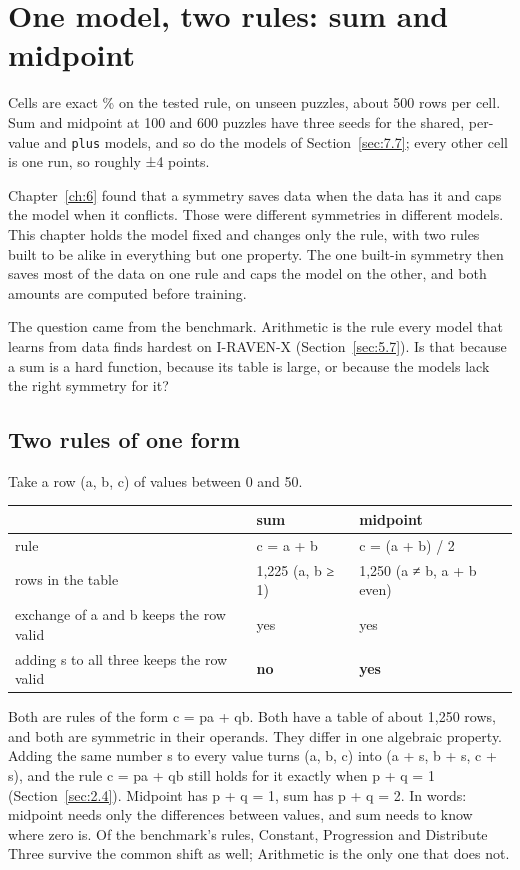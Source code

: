\chapter{One model, two rules: sum and midpoint}\label{ch:7}

Cells are exact \% on the tested rule, on unseen puzzles, about 500 rows per cell. Sum and midpoint at 100 and 600 puzzles have three seeds for the shared, per-value and \texttt{plus} models, and so do the models of Section~\ref{sec:7.7}; every other cell is one run, so roughly ±4 points.

Chapter~\ref{ch:6} found that a symmetry saves data when the data has it and caps the model when it conflicts. Those were different symmetries in different models. This chapter holds the model fixed and changes only the rule, with two rules built to be alike in everything but one property. The one built-in symmetry then saves most of the data on one rule and caps the model on the other, and both amounts are computed before training.

The question came from the benchmark. Arithmetic is the rule every model that learns from data finds hardest on I-RAVEN-X (Section~\ref{sec:5.7}). Is that because a sum is a hard function, because its table is large, or because the models lack the right symmetry for it?

\section{Two rules of one form}\label{sec:7.1}

Take a row (a, b, c) of values between 0 and 50.

\begin{center}\small
\begin{tabularx}{\linewidth}{@{}YlY@{}}
\toprule
 & sum & midpoint \\
\midrule
rule & c = a + b & c = (a + b) / 2 \\
rows in the table & 1,225 (a, b ≥ 1) & 1,250 (a ≠ b, a + b even) \\
exchange of a and b keeps the row valid & yes & yes \\
adding s to all three keeps the row valid & \textbf{no} & \textbf{yes} \\
\bottomrule
\end{tabularx}
\end{center}

Both are rules of the form c = pa + qb. Both have a table of about 1,250 rows, and both are symmetric in their operands. They differ in one algebraic property. Adding the same number s to every value turns (a, b, c) into (a + s, b + s, c + s), and the rule c = pa + qb still holds for it exactly when p + q = 1 (Section~\ref{sec:2.4}). Midpoint has p + q = 1, sum has p + q = 2. In words: midpoint needs only the differences between values, and sum needs to know where zero is. Of the benchmark's rules, Constant, Progression and Distribute Three survive the common shift as well; Arithmetic is the only one that does not.

